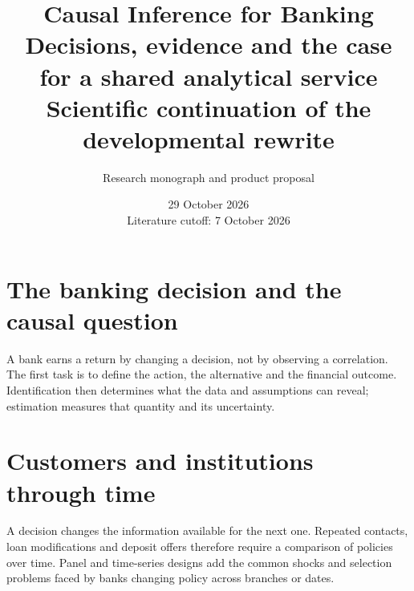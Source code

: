 \documentclass[11pt,a4paper,openany]{book}
\title{\sffamily\bfseries\color{ink}Causal Inference for Banking\\[14pt]
\Large Decisions, evidence and the case for a shared analytical service\\[8pt]\large Scientific continuation of the developmental rewrite}
\author{Research monograph and product proposal}
\date{29 October 2026\\Literature cutoff: 7 October 2026}
\begin{document}
\frontmatter
\maketitle

\begingroup\setlength{\parskip}{0pt}\tableofcontents\endgroup
\mainmatter
\part{The banking decision and the causal question}
\label{reading:part-decision}
A bank earns a return by changing a decision, not by observing a correlation.
The first task is to define the action, the alternative and the financial outcome.
Identification then determines what the data and assumptions can reveal;
estimation measures that quantity and its uncertainty.







\part{Customers and institutions through time}
\label{reading:part-time}
A decision changes the information available for the next one. Repeated
contacts, loan modifications and deposit offers therefore require a comparison
of policies over time. Panel and time-series designs add the common shocks
and selection problems faced by banks changing policy across branches or dates.








\end{document}
